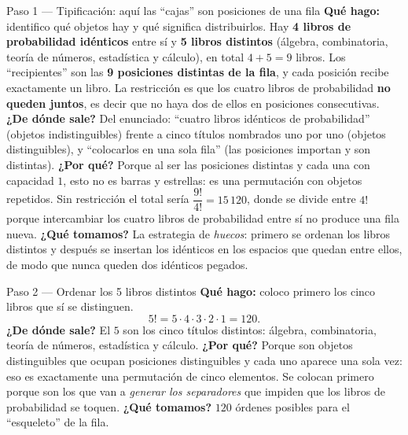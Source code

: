 \documentclass[11pt]{article}
\begin{document}
\begin{paso}{Paso 1 --- Tipificación: aquí las ``cajas'' son posiciones de una fila}
\textbf{Qué hago:} identifico qué objetos hay y qué significa distribuirlos.
Hay \textbf{4 libros de probabilidad idénticos} entre sí y \textbf{5 libros distintos} (álgebra, combinatoria, teoría de números, estadística y cálculo), en total $4+5=9$ libros. Los ``recipientes'' son las \textbf{9 posiciones distintas de la fila}, y cada posición recibe exactamente un libro. La restricción es que los cuatro libros de probabilidad \textbf{no queden juntos}, es decir que no haya dos de ellos en posiciones consecutivas.
\textbf{¿De dónde sale?} Del enunciado: ``cuatro libros idénticos de probabilidad'' (objetos indistinguibles) frente a cinco títulos nombrados uno por uno (objetos distinguibles), y ``colocarlos en una sola fila'' (las posiciones importan y son distintas).
\textbf{¿Por qué?} Porque al ser las posiciones distintas y cada una con capacidad $1$, esto no es barras y estrellas: es una permutación con objetos repetidos. Sin restricción el total sería $\dfrac{9!}{4!}=15\,120$, donde se divide entre $4!$ porque intercambiar los cuatro libros de probabilidad entre sí no produce una fila nueva.
\textbf{¿Qué tomamos?} La estrategia de \emph{huecos}: primero se ordenan los libros distintos y después se insertan los idénticos en los espacios que quedan entre ellos, de modo que nunca queden dos idénticos pegados.
\end{paso}

\begin{paso}{Paso 2 --- Ordenar los 5 libros distintos}
\textbf{Qué hago:} coloco primero los cinco libros que sí se distinguen.
\[
5!=5\cdot4\cdot3\cdot2\cdot1=120 .
\]
\textbf{¿De dónde sale?} El $5$ son los cinco títulos distintos: álgebra, combinatoria, teoría de números, estadística y cálculo.
\textbf{¿Por qué?} Porque son objetos distinguibles que ocupan posiciones distinguibles y cada uno aparece una sola vez: eso es exactamente una permutación de cinco elementos. Se colocan primero porque son los que van a \emph{generar los separadores} que impiden que los libros de probabilidad se toquen.
\textbf{¿Qué tomamos?} $120$ órdenes posibles para el ``esqueleto'' de la fila.
\end{paso}
\end{document}
